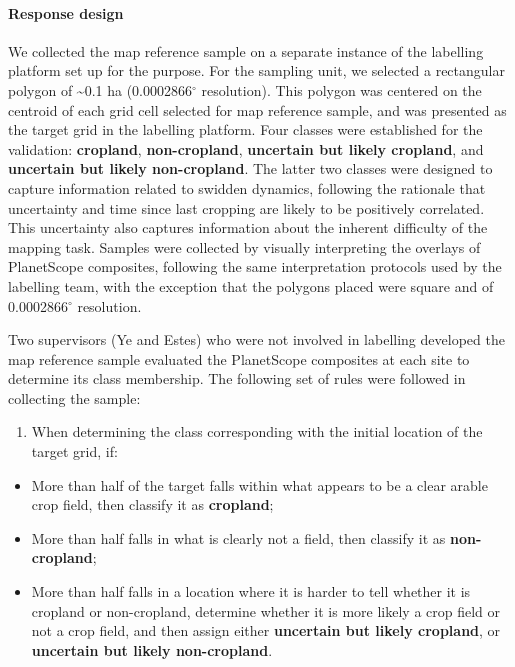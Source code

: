\documentclass[
  11pt,
  a4paper]{article}
\providecommand{\tightlist}{%
  \setlength{\itemsep}{0pt}\setlength{\parskip}{0pt}}
\begin{document}
\hypertarget{response-design}{%
\paragraph{Response design}\label{response-design}}

We collected the map reference sample on a separate instance of the
labelling platform set up for the purpose. For the sampling unit, we
selected a rectangular polygon of \textasciitilde0.1 ha
(0.0002866\(^\circ\) resolution). This polygon was centered on the
centroid of each grid cell selected for map reference sample, and was
presented as the target grid in the labelling platform. Four classes
were established for the validation: \textbf{cropland},
\textbf{non-cropland}, \textbf{uncertain but likely cropland}, and
\textbf{uncertain but likely non-cropland}. The latter two classes were
designed to capture information related to swidden dynamics, following
the rationale that uncertainty and time since last cropping are likely
to be positively correlated. This uncertainty also captures information
about the inherent difficulty of the mapping task. Samples were
collected by visually interpreting the overlays of PlanetScope
composites, following the same interpretation protocols used by the
labelling team, with the exception that the polygons placed were square
and of 0.0002866\(^\circ\) resolution.

Two supervisors (Ye and Estes) who were not involved in labelling
developed the map reference sample evaluated the PlanetScope composites
at each site to determine its class membership. The following set of
rules were followed in collecting the sample:

\begin{enumerate}
\def\labelenumi{\arabic{enumi}.}
\tightlist
\item
  When determining the class corresponding with the initial location of
  the target grid, if:
\end{enumerate}

\begin{itemize}
\tightlist
\item
  More than half of the target falls within what appears to be a clear
  arable crop field, then classify it as \textbf{cropland};
\item
  More than half falls in what is clearly not a field, then classify it
  as \textbf{non-cropland};
\item
  More than half falls in a location where it is harder to tell whether
  it is cropland or non-cropland, determine whether it is more likely a
  crop field or not a crop field, and then assign either
  \textbf{uncertain but likely cropland}, or \textbf{uncertain but
  likely non-cropland}.
\end{itemize}
\end{document}
